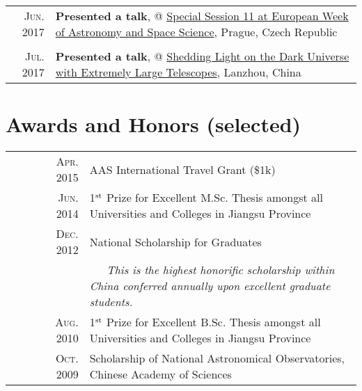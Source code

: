 \documentclass[letterpaper,10pt]{article}
\begin{document}
\begin{longtable}{r|p{5.5in}}
    \textsc{Jun. 2017}   &   \textbf{Presented a talk}, @ 
    \href{http://eas.unige.ch/EWASS2017/session.jsp?id=SS11}{Special Session 11 at 
    European Week of Astronomy and Space Science}, Prague, Czech Republic   \\
    \multicolumn{2}{c}{} \\

    \textsc{Jul. 2017}   &   \textbf{Presented a talk}, @
    \href{http://darkuniverse2017.csp.escience.cn/dct/page/65580}{Shedding Light on 
    the Dark Universe with Extremely Large Telescopes}, Lanzhou, China      \\

\end{longtable}


\section{Awards and Honors (selected)}
\begin{tabular}{rp{5in}}
~~~~~~\textsc{Apr. 2015} & AAS International Travel Grant (\$1k)    \\
~~~~~~\textsc{Jun. 2014} & 1$^{\rm st}$ Prize for Excellent M.Sc. Thesis amongst all Universities and Colleges in Jiangsu Province   \\
~~~~~~\textsc{Dec. 2012} & National Scholarship for Graduates   \\
& {\it\small ~~~This is the highest honorific scholarship within China conferred annually upon excellent graduate students.}\\
~~~~~~\textsc{Aug. 2010} & 1$^{\rm st}$ Prize for Excellent B.Sc. Thesis amongst all Universities and Colleges in Jiangsu Province   \\
~~~~~~\textsc{Oct. 2009} & Scholarship of National Astronomical Observatories, Chinese Academy of Sciences    \\
\end{tabular}
\end{document}
